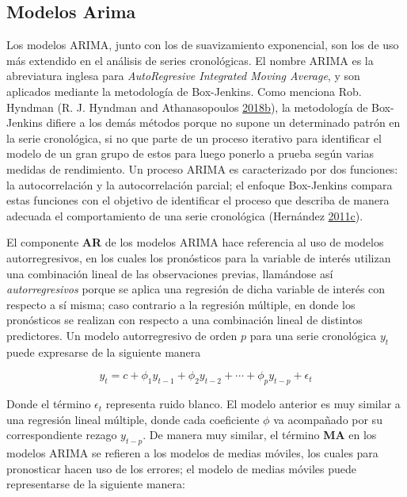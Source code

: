 \documentclass[]{article}
\begin{document}
\subsection{Modelos Arima}

Los modelos ARIMA, junto con los de suavizamiento exponencial, son los
de uso más extendido en el análisis de series cronológicas. El nombre
ARIMA es la abreviatura inglesa para \emph{AutoRegresive Integrated
Moving Average}, y son aplicados mediante la metodología de Box-Jenkins.
Como menciona Rob. Hyndman (R. J. Hyndman and Athanasopoulos
\protect\hyperlink{ref-hyndman_box-jenkins}{2018}\protect\hyperlink{ref-hyndman_box-jenkins}{b}),
la metodología de Box-Jenkins difiere a los demás métodos porque no
supone un determinado patrón en la serie cronológica, si no que parte de
un proceso iterativo para identificar el modelo de un gran grupo de
estos para luego ponerlo a prueba según varias medidas de rendimiento.
Un proceso ARIMA es caracterizado por dos funciones: la autocorrelación
y la autocorrelación parcial; el enfoque Box-Jenkins compara estas
funciones con el objetivo de identificar el proceso que describa de
manera adecuada el comportamiento de una serie cronológica (Hernández
\protect\hyperlink{ref-oscarh-3}{2011}\protect\hyperlink{ref-oscarh-3}{c}).

El componente \textbf{AR} de los modelos ARIMA hace referencia al uso de
modelos autorregresivos, en los cuales los pronósticos para la variable
de interés utilizan una combinación lineal de las observaciones previas,
llamándose así \emph{autorregresivos} porque se aplica una regresión de
dicha variable de interés con respecto a sí misma; caso contrario a la
regresión múltiple, en donde los pronósticos se realizan con respecto a
una combinación lineal de distintos predictores. Un modelo
autorregresivo de orden \(p\) para una serie cronológica \(y_t\) puede
expresarse de la siguiente manera

\begin{equation}
y_t=c+\phi_1y_{t-1}+\phi_2y_{t-2}+\cdots+\phi_py_{t-p}+\epsilon_t
\end{equation}

Donde el término \(\epsilon_t\) representa ruido blanco. El modelo
anterior es muy similar a una regresión lineal múltiple, donde cada
coeficiente \(\phi\) va acompañado por su correspondiente rezago
\(y_{t-p}\). De manera muy similar, el término \textbf{MA} en los
modelos ARIMA se refieren a los modelos de medias móviles, los cuales
para pronosticar hacen uso de los errores; el modelo de medias móviles
puede representarse de la siguiente manera:
\end{document}
